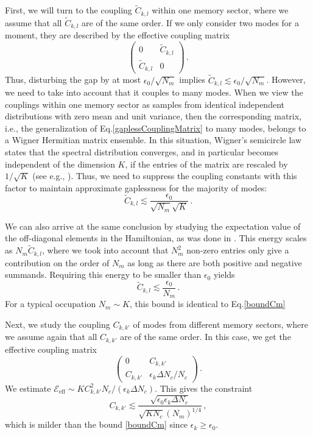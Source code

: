 \documentclass[aps,prd,reprint,superscriptaddress,nofootinbib]{revtex4-2}
\makeatletter
\newcommand*{\ie}{i.e., }
\newcommand*{\eg}{e.g., }
\newcommand*{\Eq}{Eq.\@\xspace}
\makeatother
\begin{document}
First, we will turn to the coupling $\tilde{C}_{k,l}$ within one memory sector, where we assume that all $\tilde{C}_{k,l}$ are of the same order. If we only consider two modes for a moment, they are described by the effective coupling matrix
\begin{equation} \label{gaplessCouplingMatrix}
\begin{pmatrix}
0 & \tilde{C}_{k,l}\\
\tilde{C}_{k,l} &0 
\end{pmatrix}\,.
\end{equation}
Thus, disturbing the gap by at most $\epsilon_0/\sqrt{N_m}$ implies $\tilde{C}_{k,l} \lesssim \epsilon_0/\sqrt{N_m}$. However, we need to take into account that it couples to many modes.  When we view the couplings within one memory sector as samples from identical independent distributions with zero mean and unit variance, then the corresponding matrix, \ie the generalization of \Eq \eqref{gaplessCouplingMatrix} to many modes, belongs to a Wigner Hermitian matrix ensemble. In this situation, Wigner's semicircle law states that the spectral distribution converges, and in particular becomes independent of the dimension $K$, if the entries of the matrix are rescaled by $1/\sqrt{K}$ (see \eg \cite{RMT}). Thus, we need to suppress the coupling constants with this factor to maintain  approximate gaplessness for the majority of modes:
\begin{equation} \label{boundCm}
\tilde{C}_{k,l} \lesssim \frac{\epsilon_0}{\sqrt{N_m} \sqrt{K}} \,.
\end{equation}

We can also arrive at the same conclusion by studying the expectation value of the off-diagonal elements in the Hamiltonian, as was done in \cite{1804.06154}. This energy scales as $N_m \tilde{C}_{k,l}$, where we took into account that $N_m^2$ non-zero entries only give a contribution on the 
order of $N_m$ as long as there are both positive and negative summands. Requiring this energy to be smaller than $\epsilon_0$ yields
\begin{equation} \label{boundCm2}
\tilde{C}_{k,l} \lesssim \frac{\epsilon_0}{N_m} \,.
\end{equation}
For a typical occupation $N_m \sim K$, this bound is identical to \Eq \eqref{boundCm}

Next, we study the coupling $C_{k,k'}$ of modes from different memory sectors, where we assume again that all $C_{k,k'}$ are of the same order. In 
this case, we get the effective coupling matrix 
\begin{equation} \label{gapCouplingMatrix}
\begin{pmatrix}
0 & C_{k,k'}\\
C_{k,k'} & \epsilon_k\Delta N_c/N_c 
\end{pmatrix}\,.
\end{equation}
We estimate $\mathcal{E}_{\text{eff}}  \sim K C_{k,k'}^2N_c/(\epsilon_k\Delta N_c)$. This gives the constraint
\begin{equation}
C_{k,k'} \lesssim \frac{\sqrt{\epsilon_0 \epsilon_k \Delta N_c}}{\sqrt{K N_c} (N_m)^{1/4}} \,,
\end{equation}
which is milder than the bound \eqref{boundCm} since $\epsilon_k\geq\epsilon_0$.
\end{document}
